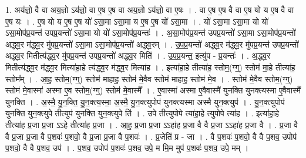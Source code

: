 \documentclass[17pt]{extarticle}
\begin{document}
1. अय॑ज्ञो॒ वै वा अय॒ज्ञो ऽय॑ज्ञो॒ वा ए॒ष ए॒ष वा अय॒ज्ञो ऽय॑ज्ञो॒ वा ए॒षः । . वा ए॒ष ए॒ष वै वा ए॒ष यो य ए॒ष वै वा ए॒ष यः । . ए॒ष यो य ए॒ष ए॒ष यो॑ ऽसा॒मा ऽसा॒मा य ए॒ष ए॒ष यो॑ ऽसा॒मा । . यो॑ ऽसा॒मा ऽसा॒मा यो यो॑ ऽसा॒मोप॑प्र॒यन्त॑ उपप्र॒यन्तो॑ ऽसा॒मा यो यो॑ ऽसा॒मोप॑प्र॒यन्तः॑ । . अ॒सा॒मोप॑प्र॒यन्त॑ उपप्र॒यन्तो॑ ऽसा॒मा ऽसा॒मोप॑प्र॒यन्तो॑ अद्ध्व॒र म॑द्ध्व॒र मु॑पप्र॒यन्तो॑ ऽसा॒मा ऽसा॒मोप॑प्र॒यन्तो॑ अद्ध्व॒रम् । . उ॒प॒प्र॒यन्तो॑ अद्ध्व॒र म॑द्ध्व॒र मु॑पप्र॒यन्त॑ उपप्र॒यन्तो॑ अद्ध्व॒र मितीत्य॑द्ध्व॒र मु॑पप्र॒यन्त॑ उपप्र॒यन्तो॑ अद्ध्व॒र मिति॑ । . उ॒प॒प्र॒यन्त॒ इत्यु॑प - प्र॒यन्तः॑ । . अ॒द्ध्व॒र मितीत्य॑द्ध्व॒र म॑द्ध्व॒र मित्या॑हा॒हे त्य॑द्ध्व॒र म॑द्ध्व॒र मित्या॑ह । . इत्या॑हा॒हे तीत्या॑ह॒ स्तोम॒(ग्ग्॒) स्तोम॑ मा॒हे तीत्या॑ह॒ स्तोम᳚म् । . आ॒ह॒ स्तोम॒(ग्ग्॒) स्तोम॑ माहाह॒ स्तोम॑ मे॒वैव स्तोम॑ माहाह॒ स्तोम॑ मे॒व । . स्तोम॑ मे॒वैव स्तोम॒(ग्ग्॒) स्तोम॑ मे॒वास्मा॑ अस्मा ए॒व स्तोम॒(ग्ग्॒) स्तोम॑ मे॒वास्मै᳚ । . ए॒वास्मा॑ अस्मा ए॒वैवास्मै॑ युनक्ति युनक्त्यस्मा ए॒वैवास्मै॑ युनक्ति । . अ॒स्मै॒ यु॒न॒क्ति॒ यु॒न॒क्त्य॒स्मा॒ अ॒स्मै॒ यु॒न॒क्त्युपोप॑ युनक्त्यस्मा अस्मै युन॒क्त्युप॑ । . यु॒न॒क्त्युपोप॑ युनक्ति युन॒क्त्युपे तीत्युप॑ युनक्ति युन॒क्त्युपे ति॑ । . उपे तीत्युपोपे त्या॑हा॒हे त्युपोपे त्या॑ह । . इत्या॑हा॒हे तीत्या॑ह प्र॒जा प्र॒जा ऽऽहे तीत्या॑ह प्र॒जा । . आ॒ह॒ प्र॒जा प्र॒जा ऽऽहा॑ह प्र॒जा वै वै प्र॒जा ऽऽहा॑ह प्र॒जा वै । . प्र॒जा वै वै प्र॒जा प्र॒जा वै प॒शवः॑ प॒शवो॒ वै प्र॒जा प्र॒जा वै प॒शवः॑ । . प्र॒जेति॑ प्र - जा । . वै प॒शवः॑ प॒शवो॒ वै वै प॒शव॒ उपोप॑ प॒शवो॒ वै वै प॒शव॒ उप॑ । . प॒शव॒ उपोप॑ प॒शवः॑ प॒शव॒ उपे॒ म मि॒म मुप॑ प॒शवः॑ प॒शव॒ उपे॒ मम् । \newline
\end{document}
